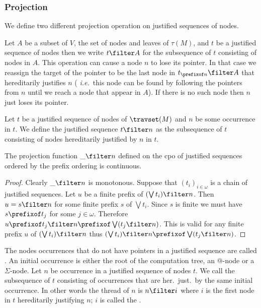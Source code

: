 \subsubsection{Projection}

We define two different projection operation on justified sequences
of nodes.

Let $A$ be a subset of $V$, the set of nodes and leaves of
$\tau(M)$, and $t$ be  a justified sequence of nodes then we write
$t\filter A$ for the subsequence of $t$ consisting of nodes in $A$.
This operation can cause a node $n$ to lose its pointer. In that
case we reassign the target of the pointer to be the last node in
$t_{\prefixof n}\filter A$ that hereditarily justifies $n$ ({\it
i.e.}\ this node can be found by following the pointers from $n$
until we reach a node that appear in $A$). If there is no such node
then $n$ just loses its pointer.


\begin{definition}
Let $t$ be a justified sequence of nodes of $\travset(M)$ and $n$ be
some occurrence in $t$. We define the justified sequence $t \filter
n$ as  the subsequence of $t$ consisting of nodes hereditarily
justified by $n$ in $t$.
\end{definition}

\begin{lemma}
\label{lem:projection_continuous} The projection function $\_
\filter n$ defined on the cpo of justified sequences ordered by the
prefix ordering is continuous.
\end{lemma}
\begin{proof}
Clearly $\_ \filter n$ is monotonous.
Suppose that $(t_i)_{i\in\omega}$ is a chain of justified sequences. Let $u$ be a finite prefix of $(\bigvee t_i) \filter n$.
Then $u = s \filter n$ for some finite prefix $s$ of $\bigvee t_i$. Since $s$ is finite we must have $s \prefixof t_j$ for some $j\in\omega$.
Therefore $u \prefixof t_j \filter n \prefixof \bigvee (t_j \filter  n)$.
This is valid for any finite prefix $u$ of $(\bigvee t_i) \filter n$ thus $(\bigvee t_i) \filter  n \prefixof \bigvee (t_j \filter n)$.
\end{proof}


The nodes occurrences that do not have pointers in a justified
sequence are called . An initial
occurrence is either the root of the computation tree,
an @-node or a $\Sigma$-node. Let $n$ be occurrence in a justified
sequence of nodes $t$. We call
 the subsequence of $t$
consisting of occurrences that are her.\ just.\ by the same initial
occurrence. In other words the thread of $n$ is $n \filter i$ where
$i$ is the first node in $t$ hereditarily justifying $n$; $i$ is
called the .

